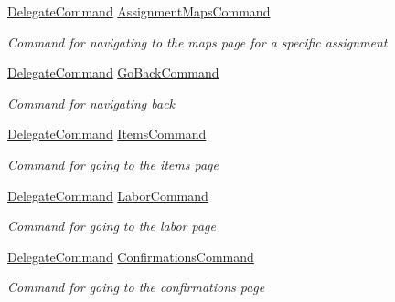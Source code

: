 \begin{DoxyCompactItemize}
\hyperlink{class_delegate_command}{Delegate\+Command} \hyperlink{class_field_service_1_1_win_r_t_1_1_view_models_1_1_assignment_view_model_a959b5a824df1686acc78b285a266b2ec}{Assignment\+Maps\+Command}
\begin{DoxyCompactList}\small\item\em Command for navigating to the maps page for a specific assignment \end{DoxyCompactList}\item 
\hyperlink{class_delegate_command}{Delegate\+Command} \hyperlink{class_field_service_1_1_win_r_t_1_1_view_models_1_1_assignment_view_model_a3b6a6dc8faf6277ea14ac95751a1cf64}{Go\+Back\+Command}
\begin{DoxyCompactList}\small\item\em Command for navigating back \end{DoxyCompactList}\item 
\hyperlink{class_delegate_command}{Delegate\+Command} \hyperlink{class_field_service_1_1_win_r_t_1_1_view_models_1_1_assignment_view_model_aa48e60e741ca0280996f4fdbdd1d7454}{Items\+Command}
\begin{DoxyCompactList}\small\item\em Command for going to the items page \end{DoxyCompactList}\item 
\hyperlink{class_delegate_command}{Delegate\+Command} \hyperlink{class_field_service_1_1_win_r_t_1_1_view_models_1_1_assignment_view_model_aad9d49fbfc91e292038432789c5dfc77}{Labor\+Command}
\begin{DoxyCompactList}\small\item\em Command for going to the labor page \end{DoxyCompactList}\item 
\hyperlink{class_delegate_command}{Delegate\+Command} \hyperlink{class_field_service_1_1_win_r_t_1_1_view_models_1_1_assignment_view_model_af549648d2778facab339809b79dd6007}{Confirmations\+Command}
\begin{DoxyCompactList}\small\item\em Command for going to the confirmations page \end{DoxyCompactList}\item 

\end{DoxyCompactItemize}
